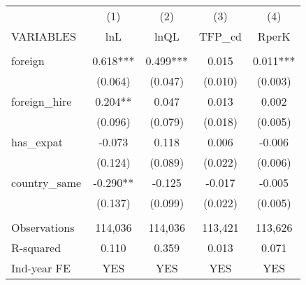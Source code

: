 \begin{tabular}{lcccc} \hline
 & (1) & (2) & (3) & (4) \\
VARIABLES & lnL & lnQL & TFP\_cd & RperK \\ \hline
 &  &  &  &  \\
foreign & 0.618*** & 0.499*** & 0.015 & 0.011*** \\
 & (0.064) & (0.047) & (0.010) & (0.003) \\
foreign\_hire & 0.204** & 0.047 & 0.013 & 0.002 \\
 & (0.096) & (0.079) & (0.018) & (0.005) \\
has\_expat & -0.073 & 0.118 & 0.006 & -0.006 \\
 & (0.124) & (0.089) & (0.022) & (0.006) \\
country\_same & -0.290** & -0.125 & -0.017 & -0.005 \\
 & (0.137) & (0.099) & (0.022) & (0.005) \\
 &  &  &  &  \\
Observations & 114,036 & 114,036 & 113,421 & 113,626 \\
R-squared & 0.110 & 0.359 & 0.013 & 0.071 \\
 Ind-year FE & YES & YES & YES & YES \\ \hline
\end{tabular}
